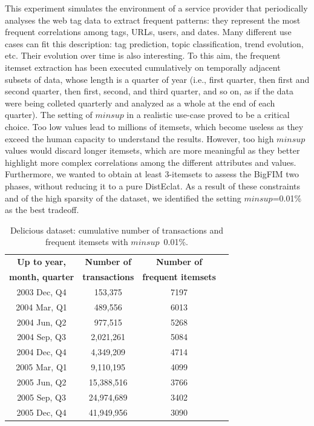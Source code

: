 This experiment simulates the environment of a service provider that
periodically analyses the web tag data to extract frequent patterns: they
represent the most frequent correlations among tags, URLs, users, and dates.
Many different use cases can fit this description:
tag prediction, topic classification, trend evolution, etc.
Their evolution over time is also interesting.
To this aim, the frequent itemset extraction has been executed
cumulatively on temporally adjacent subsets of data,
whose length is a quarter of year (i.e., first quarter,
then first and second quarter, then first, second, and third quarter, and so on,
as if the data were being colleted quarterly and analyzed as a whole at the
end of each quarter).
The setting of $minsup$ in a realistic use-case proved to be a critical choice.
Too low values lead to millions of itemsets,
which become useless as they exceed the human capacity to understand the results.
However, too high $minsup$ values would discard longer itemsets,
which are more meaningful
as they better highlight more complex correlations
among the different attributes and values.
Furthermore, we wanted to obtain at least 3-itemsets to assess
the BigFIM two phases, without reducing it to a pure DistEclat.
As a result of these constraints and of the high sparsity of the dataset,
we identified the setting $minsup$=0.01\% as the best tradeoff.

\begin{table}[h]
\scriptsize
\begin{center}
\caption{Delicious dataset: cumulative number of transactions and frequent itemsets
with $minsup$~0.01\%.}
\label{delicious_itemsets}
\begin{tabular}{|c|c|c|c|}
\hline
{\bf Up to year,}	& {\bf Number of} 	& {\bf	Number of} \\
{\bf month, quarter}	& {\bf transactions} 	& {\bf	frequent itemsets} \\
\hline \hline
2003 Dec, Q4 	& 153,375	 	& 7197 \\ \hline
2004 Mar, Q1  	& 489,556		& 6013 \\ \hline
2004 Jun, Q2	& 977,515		& 5268 \\ \hline
2004 Sep, Q3 	& 2,021,261		& 5084 \\ \hline
2004 Dec, Q4 	& 4,349,209		& 4714 \\ \hline
2005 Mar, Q1	& 9,110,195		& 4099 \\ \hline
2005 Jun, Q2	& 15,388,516		& 3766 \\ \hline
2005 Sep, Q3	& 24,974,689		& 3402 \\ \hline
2005 Dec, Q4	& 41,949,956		& 3090 \\ \hline
\end{tabular}
\end{center}
\end{table}


